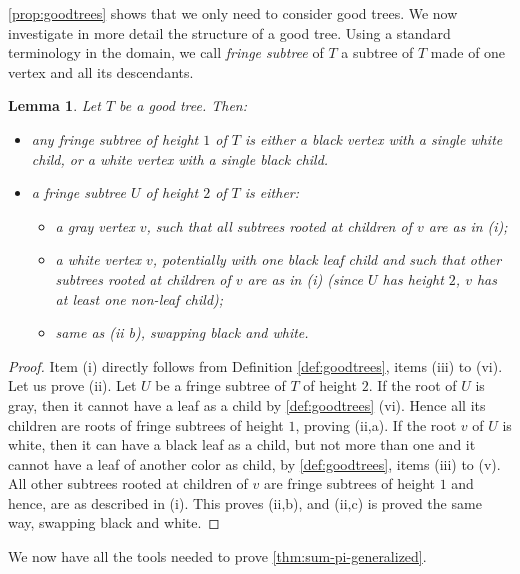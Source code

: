 \documentclass[12pt]{amsart}
\theoremstyle{plain}
\newtheorem{lemma}{Lemma}
\theoremstyle{remark}
\begin{document}
\cref{prop:goodtrees} shows that we only need to consider good trees. We now investigate in more detail the structure of a good tree. Using a standard terminology in the domain, we call \textit{fringe subtree} of $T$ a subtree of $T$ made of one vertex and all its descendants.


\begin{lemma}
\label{lem:fringe_subtrees}
Let $T$ be a good tree. Then:
\begin{itemize}
\item[(i)] any fringe subtree of height $1$ of $T$ is either a black vertex with a single white child, or a white vertex with a single black child.
\item[(ii)] a fringe subtree $U$ of height $2$ of $T$ is either:
\begin{itemize}
\item[(a)] a gray vertex $v$, such that all subtrees rooted at children of $v$ are as in (i);
\item[(b)] a white vertex $v$, potentially with one black leaf child
  and such that other  subtrees rooted at children of $v$ are as in (i)
  (since $U$ has height $2$, $v$ has at least one non-leaf child); 
\item[(c)] same as (ii b), swapping black and white.
\end{itemize}
\end{itemize} 
\end{lemma}
\begin{proof}
Item (i) directly follows from Definition \ref{def:goodtrees}, items (iii) to (vi). 
Let us prove (ii). Let $U$ be a fringe subtree of $T$ of height $2$. If the root of $U$ is gray, then it cannot have a leaf as a child by \cref{def:goodtrees} (vi). Hence all its children are roots of fringe subtrees of height $1$, proving (ii,a). If the root $v$ of $U$ is white, then it can have a black leaf as a child, but not more than one and it cannot have a leaf of another color as child, by \cref{def:goodtrees}, items (iii) to (v). All other subtrees rooted at children of $v$ are fringe subtrees of height $1$ and hence, are as described in (i). This proves (ii,b), and (ii,c) is proved the same way, swapping black and white.
\end{proof}


We now have all the tools needed to prove \cref{thm:sum-pi-generalized}.
\end{document}
